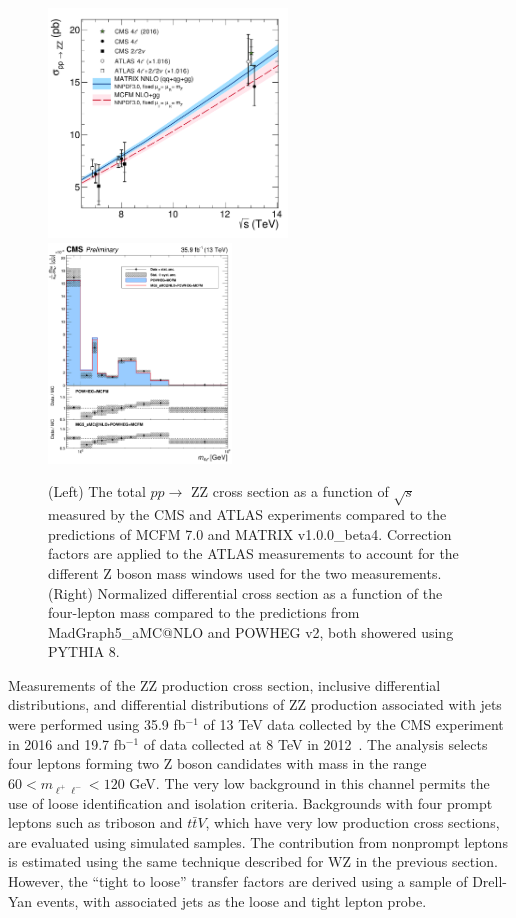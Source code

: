 \documentclass[10pt]{article}
\begin{document}
\begin{figure}[htb]
  \centering
    \includegraphics[height=2.4in]{figures/ZZCrossSection_vs_sqrtS.pdf}
    \includegraphics[height=2.3in]{figures/ZZ_13TeV_mZZ_unfolded.pdf}
    \caption{ (Left) The total $pp \rightarrow$ ZZ cross section
      as a function of $\sqrt{s}$ measured by the CMS and 
      ATLAS experiments compared to the predictions of \textsc{MCFM} 7.0 and \textsc{MATRIX} v1.0.0\_beta4. 
      Correction factors are applied to the ATLAS measurements to account
      for the different Z boson mass windows used for the two measurements.
      (Right) Normalized differential cross section as a function
      of the four-lepton mass compared to the predictions from
      MadGraph5\_aMC@NLO and \textsc{POWHEG} v2, both showered using \textsc{PYTHIA} 8.
      }
  \label{fig:ZZinclusive}
\end{figure}

Measurements of the ZZ production cross section, inclusive differential distributions,
and differential distributions of ZZ production associated with jets
were performed using 35.9 fb$^{-1}$ of 13 TeV data collected by the CMS experiment in 2016
\cite{CMS:2017ruh}\cite{CMS-PAS-SMP-16-019}
and 19.7 fb$^{-1}$ of data collected at 8 TeV in 2012~\cite{CMS-PAS-SMP-15-012}. 
The analysis selects four leptons forming two 
Z boson candidates with
mass in the range $60 < m_{\ell^{+}\ell^{-}} < 120$ GeV. The very low background
in this channel permits the use of loose identification and isolation criteria. 
Backgrounds with four prompt leptons such as triboson and $t\bar{t}V$, 
which have very
low production cross sections, are evaluated using simulated samples. The 
contribution from nonprompt leptons is estimated using the same technique
described for WZ in the previous section. However, the ``tight to loose'' transfer 
factors are derived using a sample of Drell-Yan events, with associated 
jets as the loose and tight lepton probe.
\end{document}
